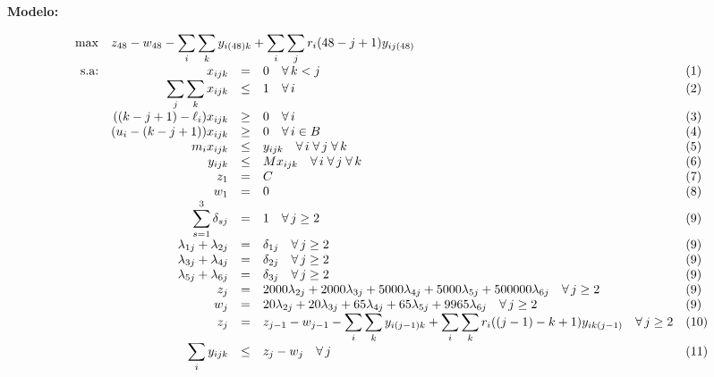 \documentclass{article}
\newcommand{\dsum}{\displaystyle\sum}
\begin{document}
\textbf{Modelo:}

\[
\begin{array}{rrcll}
    \max & \multicolumn{4}{l}{z_{48} - w_{48} - \dsum_i\dsum_{k}y_{i(48)k} + \dsum_{i}\dsum_{j}r_i(48-j+1)y_{ij(48)}}  \\
    \text{s.a:} & x_{ijk} & = & 0 \quad\forall\,k<j & \text{(1)} \\
     & \dsum_j\dsum_k x_{ijk} & \leq & 1 \quad \forall\,i & \text{(2)} \\
     & ((k-j+1) - \ell_i)x_{ijk} & \geq & 0 \quad \forall\,i & \text{(3)} \\
     & (u_i - (k-j+1))x_{ijk} & \geq & 0 \quad \forall\,i\in B & \text{(4)} \\
     & m_i x_{ijk} & \leq & y_{ijk} \quad \forall\,i\;\forall\,j\;\forall\,k  & \text{(5)} \\
     & y_{ijk} & \leq & Mx_{ijk} \quad \forall\,i\;\forall\,j\;\forall\,k & \text{(6)} \\
     & z_1 & = & C  & \text{(7)} \\
     & w_1 & = & 0 & \text{(8)} \\
     & \dsum_{s=1}^3 \delta_{sj} & = & 1  \quad \forall\,j\geq 2& \text{(9)} \\
     & \lambda_{1j} + \lambda_{2j} & = & \delta_{1j} \quad \forall\,j\geq 2 & \text{(9)} \\
     & \lambda_{3j} + \lambda_{4j} & = & \delta_{2j} \quad \forall\,j\geq 2 & \text{(9)} \\
     & \lambda_{5j} + \lambda_{6j} & = & \delta_{3j} \quad \forall\,j\geq 2 & \text{(9)} \\
     & z_j & = & 2000\lambda_{2j} + 2000\lambda_{3j} + 5000\lambda_{4j} + 5000\lambda_{5j} + 500000\lambda_{6j} \quad \forall\,j\geq 2& \text{(9)} \\
     & w_j & = & 20\lambda_{2j} + 20\lambda_{3j} + 65\lambda_{4j} + 65\lambda_{5j} + 9965\lambda_{6j} \quad \forall\,j\geq 2& \text{(9)} \\
     & z_j & = & z_{j-1} - w_{j-1} - \dsum_i\dsum_{k}y_{i(j-1)k} + \dsum_{i}\dsum_{k}r_i((j-1)-k+1)y_{ik(j-1)} \quad \forall\,j\geq 2& \text{(10)} \\
     & \dsum_i y_{ijk} & \leq  & z_j - w_j \quad \forall\,j& \text{(11)} \\

\end{array}\]
\end{document}
